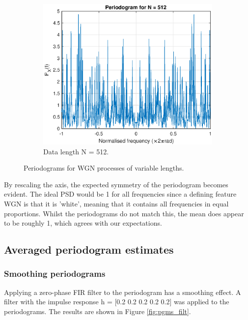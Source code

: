 \begin{figure}[H]
\begin{subfigure}{.32\textwidth}
  \centering
  \includegraphics[width=\linewidth]{assignment3figs/pgm_512.eps}  
  \caption{Data length N = 512.}
\end{subfigure}
\caption{Periodograms for WGN processes of variable lengths.}
\label{fig:pgms}
\end{figure}

\noindent
By rescaling the axis, the expected symmetry of the periodogram becomes evident. The ideal PSD would be 1 for all frequencies since a defining feature WGN is that it is 'white', meaning that it contains all frequencies in equal proportions. Whilst the periodograms do not match this, the mean does appear to be roughly 1, which agrees with our expectations. 

\subsection{Averaged periodogram estimates}

\subsubsection{Smoothing periodograms}

Applying a zero-phase FIR filter to the periodogram has a smoothing effect. A filter with the impulse response h = [0.2 0.2 0.2 0.2 0.2] was applied to the periodograms. The results are shown in Figure \ref{fig:pgms_filt}.

